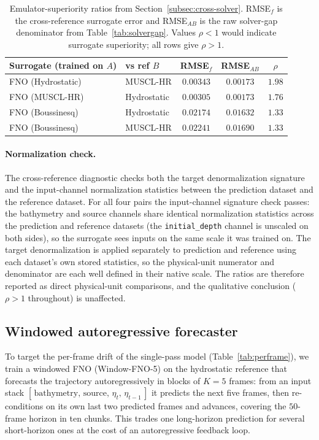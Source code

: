 \begin{table}[!htbp]
\centering
\caption{Emulator-superiority ratios from Section~\ref{subsec:cross-solver}. RMSE$_f$ is the cross-reference surrogate error and RMSE$_{AB}$ is the raw solver-gap denominator from Table~\ref{tab:solvergap}. Values $\rho<1$ would indicate surrogate superiority; all rows give $\rho>1$.}
\label{tab:superiority}
\begin{tabular}{llccc}
    \toprule
    Surrogate (trained on $A$) & vs ref $B$ & RMSE$_{f}$ & RMSE$_{AB}$ & $\rho$ \\
    \midrule
    FNO (Hydrostatic) & MUSCL-HR    & $0.00343$ & $0.00173$ & $1.98$ \\
    FNO (MUSCL-HR)    & Hydrostatic & $0.00305$ & $0.00173$ & $1.76$ \\
    FNO (Boussinesq)  & Hydrostatic & $0.02174$ & $0.01632$ & $1.33$ \\
    FNO (Boussinesq)  & MUSCL-HR    & $0.02241$ & $0.01690$ & $1.33$ \\
    \bottomrule
\end{tabular}
\end{table}

\paragraph{Normalization check.}
The cross-reference diagnostic checks both the target denormalization signature and the input-channel normalization statistics between the prediction dataset and the reference dataset. For all four pairs the input-channel signature check passes: the bathymetry and source channels share identical normalization statistics across the prediction and reference datasets (the \texttt{initial\_depth} channel is unscaled on both sides), so the surrogate sees inputs on the same scale it was trained on. The target denormalization is applied separately to prediction and reference using each dataset's own stored statistics, so the physical-unit numerator and denominator are each well defined in their native scale. The ratios are therefore reported as direct physical-unit comparisons, and the qualitative conclusion ($\rho>1$ throughout) is unaffected.

\subsection{Windowed autoregressive forecaster}
\label{subsec:res-window}
To target the per-frame drift of the single-pass model (Table~\ref{tab:perframe}), we train a windowed FNO (Window-FNO-5) on the hydrostatic reference that forecasts the trajectory autoregressively in blocks of $K = 5$ frames: from an input stack $[\,\text{bathymetry},\, \text{source},\, \eta_t,\, \eta_{t - 1}\,]$ it predicts the next five frames, then re-conditions on its own last two predicted frames and advances, covering the $50$-frame horizon in ten chunks. This trades one long-horizon prediction for several short-horizon ones at the cost of an autoregressive feedback loop.

